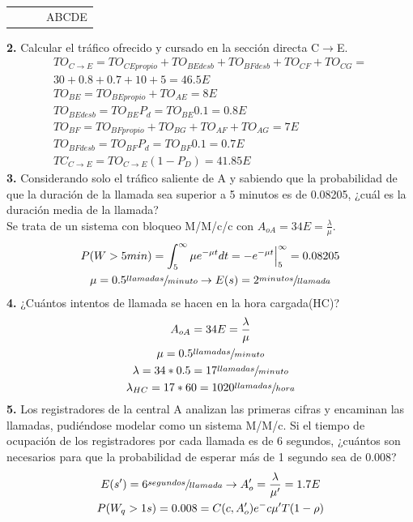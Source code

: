 \begin{exercise}[5]
\begin{center}
\begin{tabular}{c c c c}
 		& 			&			& ABCDE	\\
\end{tabular}
\end{center}
\textbf{2.} Calcular el tráfico ofrecido y cursado en la sección directa C$\to$E.\\
\begin{gather*}
TO_{C\to E}=TO_{CEpropio}+TO_{BEdesb}+TO_{BFdesb}+TO_{CF}+TO_{CG}=\\
30+0.8+0.7+10+5=46.5E\\
TO_{BE}=TO_{BEpropio}+TO_{AE}=8E\\
TO_{BEdesb}=TO_{BE}P_d=TO_{BE}0.1=0.8E\\
TO_{BF}=TO_{BFpropio}+TO_{BG}+TO_{AF}+TO_{AG}=7E\\
TO_{BFdesb}=TO_{BF}P_d=TO_{BF}0.1=0.7E\\
TC_{C\to E}=TO_{C\to E}(1-P_D)=41.85E
\end{gather*}
\textbf{3.} Considerando solo el tráfico saliente de A y sabiendo que la probabilidad de que la duración de la llamada sea superior a 5 minutos es de 0.08205, ¿cuál es la duración media de la llamada?\\
Se trata de un sistema con bloqueo M/M/c/c con $A_{oA}=34E=\frac{\lambda}{\mu}$.
\begin{gather*}
P(W>5min)=\int_{5}^{\infty}\mu e^{-\mu t}dt=-e^{-\mu t}\Big|_{5}^{\infty}=0.08205\\
\mu=0.5\sfrac{llamadas}{minuto}\to E(s)=2\sfrac{minutos}{llamada}
\end{gather*}
\textbf{4.} ¿Cuántos intentos de llamada se hacen en la hora cargada(HC)?\\
\begin{gather*}
A_{oA}=34E=\frac{\lambda}{\mu}\\
\mu=0.5\sfrac{llamadas}{minuto}\\
\lambda=34*0.5=17\sfrac{llamadas}{minuto}\\
\lambda_{HC}=17*60=1020\sfrac{llamadas}{hora}
\end{gather*}
\textbf{5.} Los registradores de la central A analizan las primeras cifras y encaminan las llamadas, pudiéndose modelar como un sistema M/M/c. Si el tiempo de ocupación de los registradores por cada llamada es de 6 segundos, ¿cuántos son necesarios para que la probabilidad de esperar más de 1 segundo sea de 0.008?\\
\begin{gather*}
E(s')=6\sfrac{segundos}{llamada}\to A'_o=\frac{\lambda}{\mu '}=1.7E\\
P(W_q>1s)=0.008=C(c,A'_o)e^-c\mu 'T(1-\rho)

\end{gather*}
\end{exercise}
